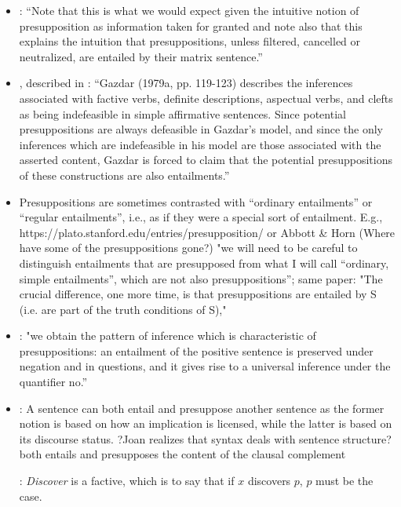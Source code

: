 \documentclass[11pt,fleqn]{article}
\newcommand{\6}{\mbox{$[\hspace*{-.6mm}[$}}
\newcommand{\9}{\mbox{$]\hspace*{-.6mm}]$}}
\begin{document}
{\begin{itemize}
\begin{itemize}
\item \citealt[345]{vds92}: ``Note that this is what we would expect given the intuitive notion of presupposition as information taken for granted and note also that this explains the intuition that presuppositions, unless filtered, cancelled or neutralized, are entailed by their matrix sentence.''

\item \citealt[119-123]{gazdar79a}, described in \citealt[66f.]{beaver01}: ``Gazdar (1979a, pp. 119-123) describes the inferences associated with factive verbs, definite descriptions, aspectual verbs, and clefts as being indefeasible in simple affirmative sentences. Since potential presuppositions are always defeasible in Gazdar's model, and since the only inferences which are indefeasible in his model are those associated with the asserted content, Gazdar is forced to claim that the potential presuppositions of these constructions are also entailments.''

\item Presuppositions are sometimes contrasted with “ordinary entailments” or “regular entailments”, i.e., as if they were a special sort of entailment. E.g., https://plato.stanford.edu/entries/presupposition/ or Abbott \& Horn (Where have some of the presuppositions gone?) "we will need to be careful to distinguish entailments that are presupposed from what I will call “ordinary, simple entailments”, which are not also presuppositions”; same paper: "The crucial difference, one more time, is that presuppositions are entailed by S (i.e. are part of the truth conditions of S),"

\item \citealt[139]{schlenker10}: "we obtain the pattern of inference which is characteristic of presuppositions: an entailment of the positive sentence is preserved under negation and in questions, and it gives rise to a universal inference under the quantifier no.”

\item \citealt[355]{ccmg90}: A sentence can both entail and presuppose another sentence as the former notion is based on how an implication is licensed, while the latter is based on its discourse status.
?Joan realizes that syntax deals with sentence structure? both entails and presupposes the content of the clausal complement

\citealt[354]{ccmg90}: {\em Discover} is a factive, which is to say that if $x$ discovers $p$, $p$ must be the case. 


\end{itemize}
\end{itemize}}
\end{document}
